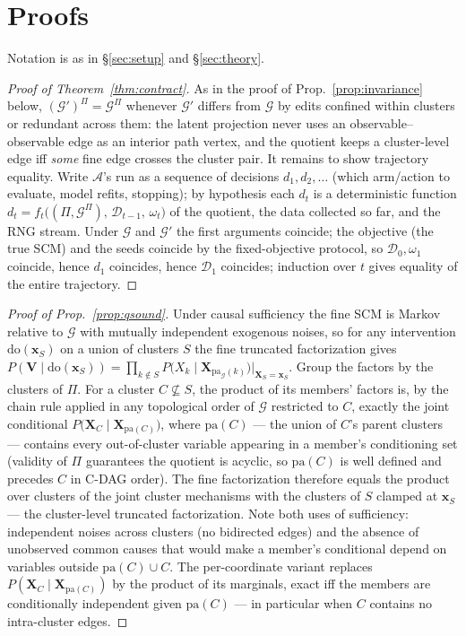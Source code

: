 \documentclass[twoside]{article}
\newcommand{\doo}{\mathrm{do}}
\newcommand{\Gg}{\mathcal{G}}
\newcommand{\Gq}{\mathcal{G}^{\Pi}}
\begin{document}
\section{Proofs}\label{app:proofs}
Notation is as in \S\ref{sec:setup} and \S\ref{sec:theory}.

\begin{proof}[Proof of Theorem~\ref{thm:contract}]
As in the proof of Prop.~\ref{prop:invariance} below, $(\Gg')^{\Pi}=\Gq$
whenever $\Gg'$ differs from $\Gg$ by edits confined within clusters or
redundant across them: the latent projection never uses an
observable--observable edge as an interior path vertex, and the quotient
keeps a cluster-level edge iff \emph{some} fine edge crosses the cluster
pair. It remains to show trajectory equality. Write $\mathcal{A}$'s run as a
sequence of decisions $d_1, d_2, \dots$ (which arm/action to evaluate,
model refits, stopping); by hypothesis each $d_t$ is a deterministic function
$d_t = f_t\big((\Pi,\Gq),\, \mathcal{D}_{t-1},\, \omega_t\big)$ of the
quotient, the data collected so far, and the RNG stream. Under $\Gg$ and
$\Gg'$ the first arguments coincide; the objective (the true SCM) and the
seeds coincide by the fixed-objective protocol, so
$\mathcal{D}_0, \omega_1$ coincide, hence $d_1$ coincides, hence
$\mathcal{D}_1$ coincides; induction over $t$ gives equality of the entire
trajectory.
\end{proof}

\begin{proof}[Proof of Prop.~\ref{prop:qsound}]
Under causal sufficiency the fine SCM is Markov relative to $\Gg$ with
mutually independent exogenous noises, so for any intervention
$\doo(\mathbf{x}_S)$ on a union of clusters $S$ the fine truncated
factorization gives
$P(\mathbf{V}\mid\doo(\mathbf{x}_S))
 = \prod_{k\notin S} P\big(X_k \mid \mathbf{X}_{\mathrm{pa}_{\Gg}(k)}\big)
 \big|_{\mathbf{X}_S=\mathbf{x}_S}$.
Group the factors by the clusters of $\Pi$. For a cluster $C\not\subseteq S$,
the product of its members' factors is, by the chain rule applied in any
topological order of $\Gg$ restricted to $C$, exactly the joint conditional
$P\big(\mathbf{X}_C \mid \mathbf{X}_{\mathrm{pa}(C)}\big)$, where
$\mathrm{pa}(C)$ --- the union of $C$'s parent clusters --- contains every
out-of-cluster variable appearing in a member's conditioning set (validity of
$\Pi$ guarantees the quotient is acyclic, so $\mathrm{pa}(C)$ is well defined
and precedes $C$ in C-DAG order). The fine factorization therefore equals the
product over clusters of the joint cluster mechanisms with the clusters of
$S$ clamped at $\mathbf{x}_S$ --- the cluster-level truncated factorization.
Note both uses of sufficiency: independent noises across clusters (no
bidirected edges) and the absence of unobserved common causes that would make
a member's conditional depend on variables outside
$\mathrm{pa}(C)\cup C$. The per-coordinate variant replaces
$P(\mathbf{X}_C\mid\mathbf{X}_{\mathrm{pa}(C)})$ by the product of its
marginals, exact iff the members are conditionally independent given
$\mathrm{pa}(C)$ --- in particular when $C$ contains no intra-cluster edges.
\end{proof}
\end{document}
